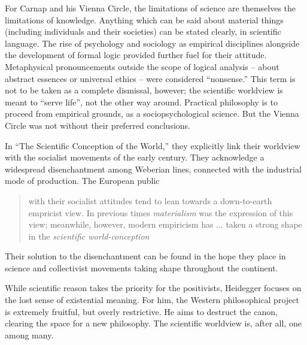 \documentclass[leqno, 12pt]{turabian-researchpaper}
\begin{document}
	For Carnap and his Vienna Circle, the limitations of science are themselves
	the limitations of knowledge. Anything which can be said about material things
	(including individuals and their societies) can be stated clearly, in
	scientific language. The rise of psychology and sociology as empirical disciplines
	alongside the development of formal logic provided further fuel for their attitude.
	Metaphysical pronouncements outside the scope of logical analysis -- about abstract
	essences or universal ethics -- were considered \enquote{nonsense.} This term is
	not to be taken as a complete dismissal, however; the scientific worldview is meant
	to \enquote{serve life}, not the other way around. Practical philosophy is to
	proceed from empirical grounds, as a sociopsychological science. But the
	Vienna Circle was not without their preferred conclusions.

	In \enquote{The Scientific Conception of the World,} \nocite{hahn1973} they
	explicitly link their worldview with the socialist movements of the early 
	century. They acknowledge a widespread disenchantment among Weberian lines, connected
	with the industrial mode of production. The European public \blockquote[{\cite[21f]{hahn1973}}]{with their socialist attitudes tend to lean towards a down-to-earth empricist view. In previous times \emph{materialism} was the expression of this view; meanwhile, however, modern empiricism has ... taken a strong shape in the \emph{scientific world-conception}}.
	Their solution to the disenchantment can be found in the hope they place in science
	and collectivist movements taking shape throughout the continent.

	While scientific reason takes the priority for the positivists, Heidegger
	focuses on the lost sense of existential meaning. For him, the Western
	philosophical project is extremely fruitful, but overly restrictive. He aims
	to destruct the canon, clearing the space for a new philosophy. The scientific
	worldview is, after all, one among many.
\end{document}

